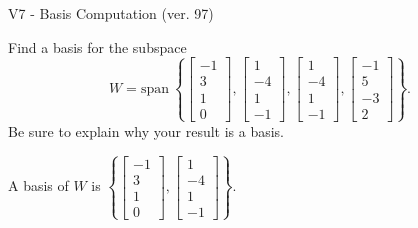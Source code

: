 \begin{exercise}
  \begin{exerciseTitle}V7 - Basis Computation (ver. 97)\end{exerciseTitle}
  \begin{exerciseStatement}
    Find a basis for the subspace 
\[W=\mathrm{span}\ \left\{\left[\begin{array}{r}
-1 \\
3 \\
1 \\
0
\end{array}\right] , \left[\begin{array}{r}
1 \\
-4 \\
1 \\
-1
\end{array}\right] , \left[\begin{array}{r}
1 \\
-4 \\
1 \\
-1
\end{array}\right] , \left[\begin{array}{r}
-1 \\
5 \\
-3 \\
2
\end{array}\right]\right\}.\]
 Be sure to explain why your result is a basis.


  \end{exerciseStatement}
  \begin{exerciseAnswer}
   A basis of \(W\) is  \(\left\{\left[\begin{array}{r}
-1 \\
3 \\
1 \\
0
\end{array}\right] , \left[\begin{array}{r}
1 \\
-4 \\
1 \\
-1
\end{array}\right]\right\}\).
  


  \end{exerciseAnswer}
\end{exercise}